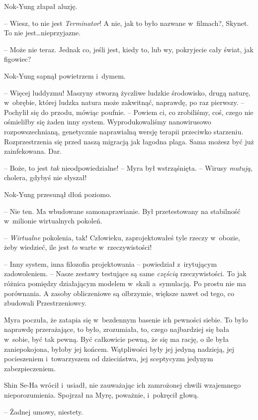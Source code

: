 \documentclass[oneside,polish,11pt,sfheadings]{mwbk}
\begin{document}
Nok-Yung złapał aluzję. 

-- Wiesz, to nie jest \textit{Terminator}! A nie,
jak to było nazwane w~filmach?, Skynet. To nie jest\ldots nieprzyjazne.

-- Może nie teraz. Jednak co, jeśli jest, kiedy to, lub wy, pokryjecie
cały świat, jak figowiec?

Nok-Yung sapnął powietrzem i~dymem. 

-- Więcej luddyzmu! Maszyny stworzą
życzliwe ludzkie środowisko, drugą naturę, w~obrębie, której ludzka
natura może zakwitnąć, naprawdę, po raz pierwszy. -- Pochylił się do
przodu, mówiąc poufnie. -- Powiem ci, co zrobiliśmy, coś, czego nie
ośmieliłby się żaden inny system. Wyprodukowaliśmy nanowirusowo
rozpowszechnianą, genetycznie naprawialną wersję terapii przeciwko
starzeniu. Rozprzestrzenia się przed naszą migracją jak łagodna plaga.
Sama możesz być już zainfekowana. Dar.

-- Boże, to jest \textit{tak} nieodpowiedzialne! -- Myra był wstrząśnięta. -- Wirusy \textit{mutują}, cholera, gdybyś nie słyszał!

Nok-Yung przesunął dłoń poziomo. 

-- Nie ten. Ma wbudowane
samonaprawianie. Był przetestowany na stabilność w~milionie wirtualnych
pokoleń.

-- \textit{Wirtualne} pokolenia, tak! Człowieku, zaprojektowałeś tyle
rzeczy w~obozie, żeby wiedzieć, ile jest \textit{to} warte w~rzeczywistości!

-- Inny system, inna filozofia projektowania -- powiedział z~irytującym
zadowoleniem. -- Nasze zestawy testujące są same \textit{częścią}
rzeczywistości. To jak różnica pomiędzy działającym modelem w~skali a~symulacją. Po prostu nie ma porównania. A zasoby obliczeniowe są
olbrzymie, większe nawet od tego, co zbudowali Przestrzeniowcy.

Myra poczuła, że zatapia się w~bezdennym basenie ich pewności siebie. To
było naprawdę przerażające, to było, zrozumiała, to, czego najbardziej
się bała w~sobie, być tak pewną. Być całkowicie pewną, że się ma rację,
o ile była zaniepokojona, byłoby jej końcem. Wątpliwości były jej jedyną
nadzieją, jej pocieszeniem i~towarzyszem od dzieciństwa, jej sceptycyzm
jedynym zabezpieczeniem.

Shin Se-Ha wrócił i~usiadł, nie zauważając ich zamrożonej chwili
wzajemnego nieporozumienia. Spojrzał na Myrę, poważnie, i~pokręcił
głową.

-- Żadnej umowy, niestety.
\end{document}
